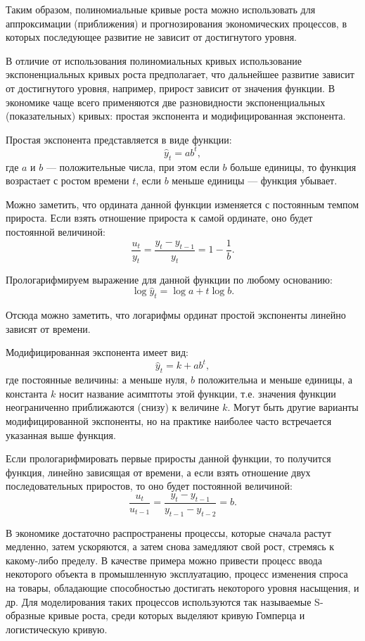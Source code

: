 Таким образом, полиномиальные кривые роста можно использовать для аппроксимации (приближения) и прогнозирования экономических процессов, в которых последующее развитие не зависит от достигнутого уровня.

В отличие от использования полиномиальных кривых использование экспоненциальных кривых роста предполагает, что дальнейшее развитие зависит от достигнутого уровня, например, прирост зависит от значения функции. В экономике чаще всего применяются две разновидности экспоненциальных (показательных) кривых: простая экспонента и модифицированная экспонента.

Простая экспонента представляется в виде функции:
\[\hat{y}_t=ab^t, \]
где $a$ и $b$ --- положительные числа, при этом если $b$ больше единицы, то функция возрастает с ростом времени $t$, если $b$ меньше единицы --- функция убывает.

Можно заметить, что ордината данной функции изменяется с постоянным темпом прироста. Если взять отношение прироста к самой ординате, оно будет постоянной величиной:
\[ \dfrac{u_t}{y_t} = \dfrac{y_t - y_{t-1}}{y_t} = 1 - \dfrac{1}{b}. \]

Прологарифмируем выражение для данной функции по любому основанию:
\[ \log \hat{y}_t = \log a + t \log b. \]

Отсюда можно заметить, что логарифмы ординат простой экспоненты линейно зависят от времени.

Модифицированная экспонента имеет вид:
\[ \hat{y}_t = k + ab^t, \]
где постоянные величины: $а$ меньше нуля, $ b $ положительна и меньше единицы, а константа $ k $ носит название асимптоты этой функции, т.е. значения функции неограниченно приближаются (снизу) к величине $ k $. Могут быть другие варианты модифицированной экспоненты, но на практике наиболее часто встречается указанная выше функция.

Если прологарифмировать первые приросты данной функции, то получится функция, линейно зависящая от времени, а если взять отношение двух последовательных приростов, то оно будет постоянной величиной:
\[ \dfrac{u_t}{u_{t-1}} = \dfrac{y_t - y_{t-1}}{y_{t-1} - y_{t-2}} = b. \]

В экономике достаточно распространены процессы, которые сначала растут медленно, затем ускоряются, а затем снова замедляют свой рост, стремясь к какому-либо пределу. В качестве примера можно привести процесс ввода некоторого объекта в промышленную эксплуатацию, процесс изменения спроса на товары, обладающие способностью достигать некоторого уровня насыщения, и др. Для моделирования таких процессов используются так называемые S-образные кривые роста, среди которых выделяют кривую Гомперца и логистическую кривую.

